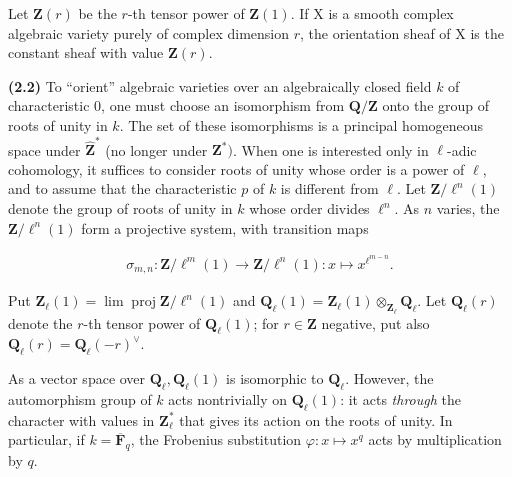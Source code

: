 \documentclass[10pt,leqno]{article}
\begin{document}
\noindent Let \(\mathbf{Z}(r)\) be the \(r\)-th tensor power of \(\mathbf{Z}(1)\). If \(\mathrm{X}\) is a smooth complex algebraic variety purely of complex dimension \(r\), the orientation sheaf of \(\mathrm{X}\) is the constant sheaf with value \(\mathbf{Z}(r)\).\par

\noindent \textbf{(2.2)} To “orient” algebraic varieties over an algebraically closed field \(k\) of characteristic 0, one must choose an isomorphism from \(\mathbf{Q}/\mathbf{Z}\) onto the group of roots of unity in \(k\). The set of these isomorphisms is a principal homogeneous space under \(\widehat{\mathbf{Z}}^{*}\) (no longer under \(\mathbf{Z}^{*})\). When one is interested only in \(\ell \)-adic cohomology, it suffices to consider roots of unity whose order is a power of \(\ell \), and to assume that the characteristic \(p\) of \(k\) is different from \(\ell \). Let \(\mathbf{Z}/\ell ^{n}(1)\) denote the group of roots of unity in \(k\) whose order divides \(\ell ^{n}\). As \(n\) varies, the \(\mathbf{Z}/\ell ^{n}(1)\) form a projective system, with transition maps\par

\begin{equation*}\begin{gathered}\sigma _{m,n} : \mathbf{Z}/\ell ^{m}(1) \longrightarrow  \mathbf{Z}/\ell ^{n}(1) : x\longmapsto x^{\ell ^{m- n}}.\end{gathered}\end{equation*}

\noindent Put \(\mathbf{Z}_{\ell }(1)=\operatorname{lim} \operatorname{proj} \mathbf{Z}/\ell ^{n}(1)\) and \(\mathbf{Q}_{\ell }(1)=\mathbf{Z}_{\ell }(1)\otimes _{\mathbf{Z}_{\ell }}\mathbf{Q}_{\ell }\). Let \(\mathbf{Q}_{\ell }(r)\) denote the \(r\)-th tensor power of \(\mathbf{Q}_{\ell }(1)\); for \(r\in \mathbf{Z}\) negative, put also \(\mathbf{Q}_{\ell }(r)=\mathbf{Q}_{\ell }(- r)^{\vee }\).\par

\clearpage

\label{physical-10}\par\smallskip

\noindent As a vector space over \(\mathbf{Q}_{\ell }, \mathbf{Q}_{\ell }(1)\) is isomorphic to \(\mathbf{Q}_{\ell }\). However, the automorphism group of \(k\) acts nontrivially on \(\mathbf{Q}_{\ell }(1)\): it acts \emph{through} the character with values in \(\mathbf{Z}_{\ell }^{*}\) that gives its action on the roots of unity. In particular, if \(k=\overline{\mathbf{F}}_{q}\), the Frobenius substitution \(\varphi :x\longmapsto x^{q}\) acts by multiplication by \(q\).\par
\end{document}
